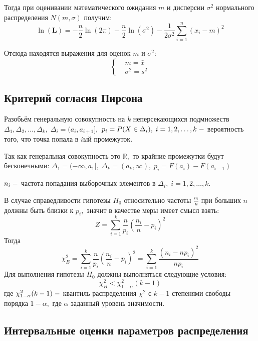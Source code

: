 \documentclass[a4]{article}
\begin{document}
Тогда при оценивании математического ожидания $m$ и дисперсии $\sigma^2$ нормального распределения $N(m,\sigma)$ получим:
\begin{equation}
\ln(\mathbf{L})=-\frac{n}{2}\ln(2\pi)-\frac{n}{2}\ln\left(\sigma^2\right)-\frac{1}{2\sigma^2}\sum\limits_{i=1}^n(x_i-m)^2
\end{equation}

Отсюда находятся выражения для оценок $m$ и $\sigma^2$:
\begin{equation}
\begin{cases}
&  m= \bar{x}\\ 
&  \sigma^{2} = s^{2}
\end{cases}
\end{equation}

\subsection{Критерий согласия Пирсона}
Разобьём генеральную совокупность на $k$ неперсекающихся подмножеств $\Delta_1, \Delta_2,\ldots, \Delta_k,\;\Delta_i = (a_i,a_{i+1}],$ $p_i = P(X\in\Delta_i),\;i=1,2,\ldots,k\; \--$ вероятность того, что точка попала в $i$ый промежуток.

Так как генеральная совокупность это $\mathbb{R},$ то крайние промежутки будут бесконечными: $\Delta_1=(-\infty,a_1],\;\Delta_k=(a_k,\infty),\;p_i = F(a_i)-F(a_{i-1})$

$n_i\;\--$ частота попадания выборочных элементов в $\Delta_i,\;i=1,2,\ldots,k.$

В случае справедливости гипотезы $H_0$ относительно частоты $\frac{n_i}{n}$ при больших $n$ должны быть близки к $p_i,$ значит в качестве меры имеет смысл взять: 
\begin{equation}
Z = \sum\limits_{i=1}^k\frac{n}{p_i}\left(\frac{n_i}{n}-p_i\right)^2
\end{equation}
Тогда
\begin{equation}
\chi^2_B=\sum\limits_{i=1}^k\frac{n}{p_i}\left(\frac{n_i}{n}-p_i\right)^2=\sum\limits_{i=1}^k\frac{(n_i-np_i)^2}{np_i}
\end{equation}
Для выполнения гипотезы $H_0$ должны выполняться следующие условия:
\begin{equation}
\chi_B^2 < \chi_{1-\alpha}^2(k-1)
\end{equation}
где $\chi_{1-\alpha}^2(k-1)\;\--$ квантиль распределения $\chi^2$ с $k-1$ степенями свободы порядка $1-\alpha,$ где $\alpha$ заданный уровень значимости.

\subsection{Интервальные оценки параметров распределения}
\end{document}
